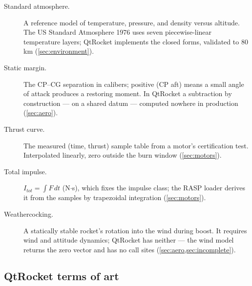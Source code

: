 \begin{description}
\item[Standard atmosphere.] A reference model of temperature, pressure, and density versus
  altitude. The US Standard Atmosphere 1976 uses seven piecewise-linear temperature layers;
  QtRocket implements the closed forms, validated to 80\,km
   (\cref{sec:environment}).

\item[Static margin.] The CP--CG separation in calibers; positive (CP aft) means a small
  angle of attack produces a restoring moment. In QtRocket a subtraction by construction
  ---  on a shared datum  --- computed nowhere in
  production (\cref{sec:aero}).

\item[Thrust curve.] The measured (time, thrust) sample table from a motor's certification
  test. Interpolated linearly, zero outside the burn window 
  (\cref{sec:motors}).

\item[Total impulse.] $I_{tot} = \int F\,dt$ (N$\cdot$s), which fixes the impulse class;
  the RASP loader derives it from the samples by trapezoidal integration
   (\cref{sec:motors}).

\item[Weathercocking.] A statically stable rocket's rotation into the wind during boost.
  It requires wind and attitude dynamics; QtRocket has neither --- the wind model returns
  the zero vector and has no call sites 
  (\cref{sec:aero,sec:incomplete}).

\end{description}

\subsection{QtRocket terms of art}\label{app:glossary-qtrocket}

